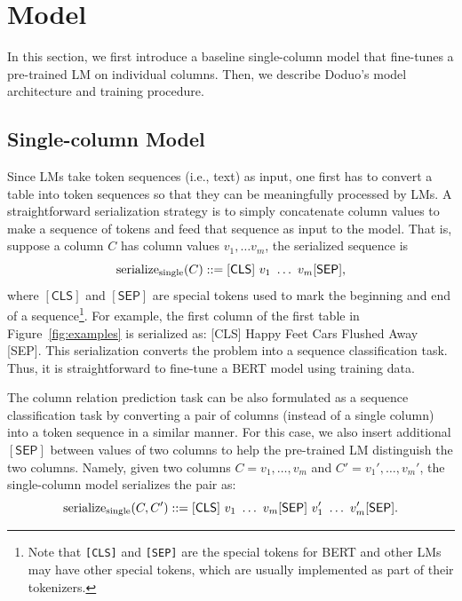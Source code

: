 \documentclass[sigconf]{acmart}
\newcommand{\name}{\mbox{\sc Doduo}}
\begin{document}
\section{Model} \label{sec:model}
In this section, we first introduce a baseline single-column model that fine-tunes a pre-trained LM on individual columns. Then, we describe \name{}'s model architecture and training procedure. 


\subsection{Single-column Model}
Since LMs take token sequences (i.e., text)
as input, one first has to convert a table into token sequences so that they can be meaningfully processed by LMs.
%
A straightforward serialization strategy is to simply concatenate column values to make a sequence of tokens and feed that sequence as input to the model.
%
That is, suppose a column $C$ has column values $v_1, \dots v_m$, the serialized sequence is
{
\setlength\abovedisplayskip{2pt}
\setlength\belowdisplayskip{2pt}
$$ {\rm serialize_{\rm single}}(C) ::= \mathsf{[CLS]} \ v_1 \  \dots \ v_m  \mathsf{ [SEP] },$$
}
%
where $\mathsf{[CLS]}$ and $\mathsf{[SEP]}$ are special tokens used to mark the beginning and end of a sequence\footnote{Note that {\tt [CLS]} and {\tt [SEP]} are the special tokens for BERT and other LMs may have other special tokens, which are usually implemented as part of their tokenizers.}. 
%
For example, the first column of the first table in Figure~\ref{fig:examples} is serialized as: \textsf{[CLS] Happy Feet Cars Flushed Away [SEP]}.
%
This serialization converts the problem into a sequence classification task. Thus, it is straightforward to fine-tune a BERT model using training data.


The column relation prediction task can be also formulated as a sequence classification task by converting a pair of columns (instead of a single column) into a token sequence in a similar manner.
%
For this case, we also insert additional $\mathsf{[SEP]}$ between values of two columns to help the pre-trained LM distinguish the two columns.
Namely, given two columns $C = v_1, \dots, v_m$ and $C' = v_1', \dots, v_m'$, the single-column model serializes the pair as:
{
\setlength\abovedisplayskip{2pt}
\setlength\belowdisplayskip{2pt}
$$ {\rm serialize_{\rm single}}(C, C') ::= \mathsf{[CLS]} \ v_1 \  \dots \ v_m  \mathsf{ [SEP] } \ v'_1 \  \dots \ v'_m  \mathsf{ [SEP] } .$$
}
\end{document}
